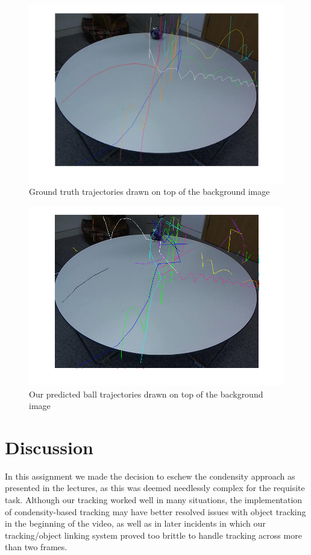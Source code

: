 \documentclass[12pt,a4paper]{article}
\begin{document}
\begin{figure}
	\centering
    \includegraphics[width=140mm]{ground_truth_trajectories.png}
    \caption{Ground truth trajectories drawn on top of the background image}
	\label{my-label05}
\end{figure} 

\begin{figure}
	\centering
    \includegraphics[width=140mm]{trajectories.png}
    \caption{Our predicted ball trajectories drawn on top of the background image}
	\label{my-label06}
\end{figure} 

\section{Discussion}
In this assignment we made the decision to eschew the condensity approach as presented in the lectures, as this was deemed needlessly complex for the requisite task. Although our tracking worked well in many situations, the implementation of condensity-based tracking may have better resolved issues with object tracking in the beginning of the video, as well as in later incidents in which our tracking/object linking system proved too brittle to handle tracking across more than two frames.
\end{document}
